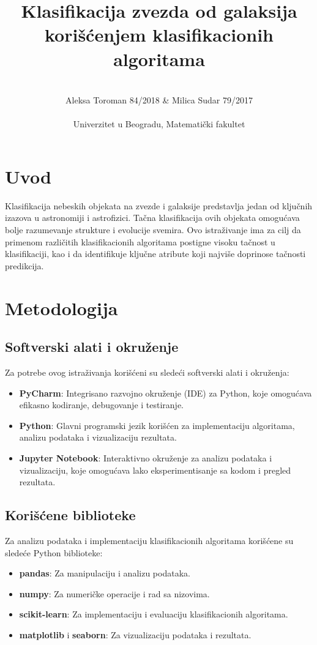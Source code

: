 \documentclass[a4paper,12pt]{article}
\title{Klasifikacija zvezda od galaksija korišćenjem klasifikacionih algoritama}
\author{\\Aleksa Toroman 84/2018 & Milica Sudar 79/2017 \\\\ Univerzitet u Beogradu, Matematički fakultet}
\begin{document}
\maketitle

\newpage
\renewcommand{\contentsname}{Sadržaj}
\tableofcontents

\newpage

\section{Uvod}
Klasifikacija nebeskih objekata na zvezde i galaksije predstavlja jedan od ključnih izazova u astronomiji i astrofizici. Tačna klasifikacija ovih objekata omogućava bolje razumevanje strukture i evolucije svemira. Ovo istraživanje ima za cilj da primenom različitih klasifikacionih algoritama postigne visoku tačnost u klasifikaciji, kao i da identifikuje ključne atribute koji najviše doprinose tačnosti predikcija.


\section{Metodologija}
\subsection{Softverski alati i okruženje}
Za potrebe ovog istraživanja korišćeni su sledeći softverski alati i okruženja:
\begin{itemize}
    \item \textbf{PyCharm}: Integrisano razvojno okruženje (IDE) za Python, koje omogućava efikasno kodiranje, debugovanje i testiranje.
    \item \textbf{Python}: Glavni programski jezik korišćen za implementaciju algoritama, analizu podataka i vizualizaciju rezultata.
    \item \textbf{Jupyter Notebook}: Interaktivno okruženje za analizu podataka i vizualizaciju, koje omogućava lako eksperimentisanje sa kodom i pregled rezultata.
\end{itemize}

\subsection{Korišćene biblioteke}
Za analizu podataka i implementaciju klasifikacionih algoritama korišćene su sledeće Python biblioteke:
\begin{itemize}
    \item \textbf{pandas}: Za manipulaciju i analizu podataka.
    \item \textbf{numpy}: Za numeričke operacije i rad sa nizovima.
    \item \textbf{scikit-learn}: Za implementaciju i evaluaciju klasifikacionih algoritama.
    \item \textbf{matplotlib} i \textbf{seaborn}: Za vizualizaciju podataka i rezultata.
\end{itemize}
\end{document}
